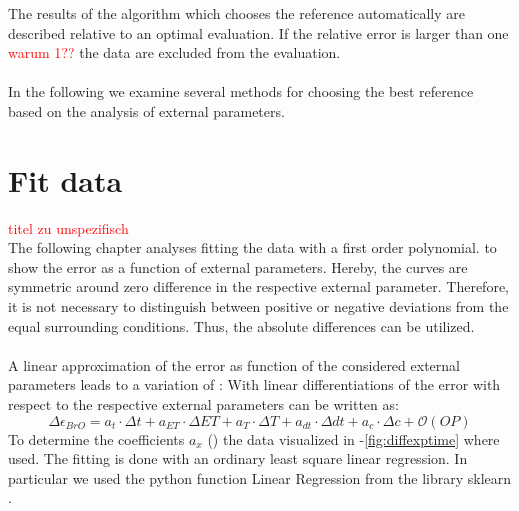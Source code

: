 \documentclass  [
  paper    = a4,
  BCOR     = 10mm,
  twoside,
  fontsize = 12pt,
  fleqn,
  toc      = bibnumbered,
  toc      = listofnumbered,
  numbers  = noendperiod,
  headings = normal,
  listof   = leveldown,
  version  = 3.03
]                                       {scrreprt}
\begin{document}
	The results of the algorithm which chooses the reference automatically are described relative to an optimal evaluation. If the relative error is larger than one \textcolor{red}{warum 1??} the data are excluded from the evaluation.\\
	\\
	In the following we examine several methods for choosing the best reference based on the analysis of external parameters. 
	
	\section{Fit data}
	\textcolor{red}{titel zu unspezifisch} \\
	The following chapter analyses fitting the data with a first order polynomial.  to  show the   error as a function of external parameters. Hereby, the curves are symmetric around zero difference in the respective external parameter. Therefore, it is not necessary to distinguish between positive or negative deviations from the equal surrounding conditions. Thus, the absolute differences can be utilized.\\
	\\
	A linear approximation of the   error as function of the considered external parameters leads to a variation of   :
	With linear differentiations of the   error with respect to the respective external parameters  can be written as:	
	\begin{equation}
		\Delta \epsilon_{BrO} = a_{t}\cdot\Delta t+a_{ET}\cdot\Delta ET+a_{T}\cdot\Delta T+a_{dt}\cdot\Delta dt +a_{c}\cdot\Delta c + \mathcal{O}\left(OP\right)
		\label{calc:delterr}
	\end{equation}
	To determine the coefficients $a_{x}$ () the data visualized in -\ref{fig:diffexptime} where used.  The fitting is done with an ordinary least square linear regression. In particular we used the python function Linear Regression from the library sklearn \citep{SKlearn}. \\
	
\end{document}
